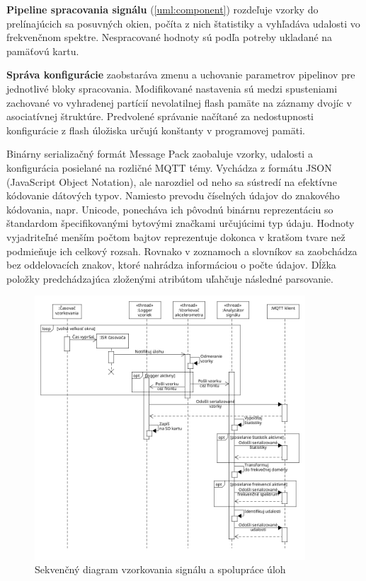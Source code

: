 \textbf{Pipeline spracovania signálu} (\ref{uml:component}) rozdeľuje vzorky do prelínajúcich sa posuvných okien, počíta z nich štatistiky
a vyhľadáva udalosti vo frekvenčnom spektre. Nespracované hodnoty sú podľa potreby ukladané na pamäťovú kartu.

\textbf{Správa konfigurácie} zaobstaráva zmenu a uchovanie parametrov pipelinov pre jednotlivé bloky spracovania.
Modifikované nastavenia sú
medzi spusteniami zachované vo vyhradenej partícií nevolatilnej flash pamäte na záznamy dvojíc v asociatívnej štruktúre. Predvolené
správanie načítané za nedostupnosti konfigurácie z flash úložiska určujú konštanty v programovej pamäti.

Binárny serializačný formát Message Pack zaobaluje vzorky, udalosti a konfigurácia posielané na rozličné MQTT témy. Vychádza z
formátu JSON (JavaScript Object Notation), ale narozdiel od neho sa sústredí na efektívne kódovanie dátových typov. Namiesto prevodu
číselných údajov do znakového kódovania, napr. Unicode, ponecháva ich pôvodnú binárnu reprezentáciu so štandardom špecifikovanými bytovými
značkami určujúcimi typ údaju. Hodnoty vyjadriteľné menším počtom bajtov reprezentuje dokonca v kratšom tvare než
podmieňuje ich celkový rozsah. Rovnako v zoznamoch a slovníkov sa  zaobchádza bez oddelovacích znakov, ktoré nahrádza
informáciou o počte údajov. Dĺžka položky predchádzajúca zloženými atribútom uľahčuje následné parsovanie.

\begin{figure}[h]
	\centering
	\includegraphics[width=0.9\textwidth]{figures/design/tasks.png}
	\caption{Sekvenčný diagram vzorkovania signálu a spolupráce úloh}
	\label{uml:sequence}
\end{figure}

